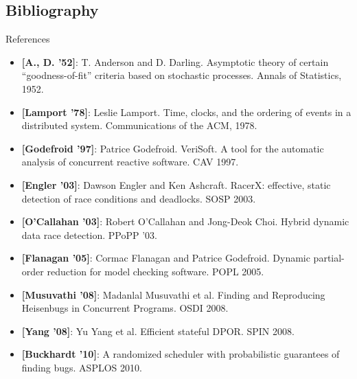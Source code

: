 \documentclass[xcolor=dvipsnames]{beamer}
\begin{document}

\subsection{Bibliography}

\begin{frame}{References}
	\footnotesize
	\begin{itemize}
		\item {\bf [A., D. '52]}: T. Anderson and D. Darling.
			Asymptotic theory of certain ``goodness-of-fit'' criteria based on stochastic processes.
			Annals of Statistics, 1952.
		\item {\bf [Lamport '78]}:
			Leslie Lamport. Time, clocks, and the ordering of events in a distributed system.
			Communications of the ACM, 1978.
		\item {\bf [Godefroid '97]}: Patrice Godefroid.
			VeriSoft. A tool for the automatic analysis of concurrent reactive software. CAV 1997.
		\item {\bf [Engler '03]}: Dawson Engler and Ken Ashcraft.
			RacerX: effective, static detection of race conditions and deadlocks. SOSP 2003.
		\item {\bf [O'Callahan '03]}: Robert O'Callahan and Jong-Deok Choi.
			Hybrid dynamic data race detection. PPoPP '03.
		\item {\bf [Flanagan '05]}: Cormac Flanagan and Patrice Godefroid. Dynamic partial-order reduction for
			model checking software. POPL 2005.
		\item {\bf [Musuvathi '08]}: Madanlal Musuvathi et al. Finding and Reproducing Heisenbugs in Concurrent
			Programs. OSDI 2008.
		\item {\bf [Yang '08]}: Yu Yang et al. Efficient stateful DPOR. SPIN 2008.
		\item {\bf [Buckhardt '10]}: A randomized scheduler with probabilistic guarantees of finding bugs. ASPLOS 2010.
	\end{itemize}
\end{frame}
\end{document}
